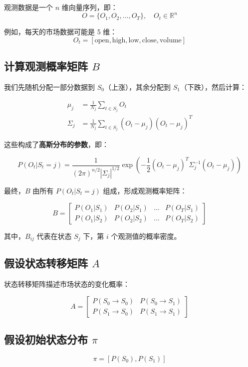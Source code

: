 \documentclass{article}
\begin{document}
观测数据是一个 $n$ 维向量序列，即：
\[
O = \{ O_1, O_2, ..., O_T \}, \quad O_t \in \mathbb{R}^n
\]

例如，每天的市场数据可能是 5 维：
\[
O_t = [\text{open}, \text{high}, \text{low}, \text{close}, \text{volume}]
\]

\subsection{计算观测概率矩阵 $B$}

我们先随机分配一部分数据到 $S_0$（上涨），其余分配到 $S_1$（下跌），然后计算：

\begin{align}
    \mu_j &= \frac{1}{N_j} \sum_{t \in S_j} O_t \\
    \Sigma_j &= \frac{1}{N_j} \sum_{t \in S_j} (O_t - \mu_j)(O_t - \mu_j)^T
\end{align}

这些构成了\textbf{高斯分布的参数}，即：

\[
P(O_t | S_t = j) = \frac{1}{(2\pi)^{n/2} |\Sigma_j|^{1/2}} \exp \left( -\frac{1}{2} (O_t - \mu_j)^T \Sigma_j^{-1} (O_t - \mu_j) \right)
\]

最终，$B$ 由所有 $P(O_t | S_t = j)$ 组成，形成观测概率矩阵：

\[
B =
\begin{bmatrix}
P(O_1 | S_1) & P(O_2 | S_1) & \dots & P(O_T | S_1) \\
P(O_1 | S_2) & P(O_2 | S_2) & \dots & P(O_T | S_2)
\end{bmatrix}
\]

其中，$B_{ij}$ 代表在状态 $S_j$ 下，第 $i$ 个观测值的概率密度。

\subsection{假设状态转移矩阵 $A$}

状态转移矩阵描述市场状态的变化概率：

\[
A =
\begin{bmatrix}
P(S_0 \to S_0) & P(S_0 \to S_1) \\
P(S_1 \to S_0) & P(S_1 \to S_1)
\end{bmatrix}
\]

\subsection{假设初始状态分布 $\pi$}

\[
\pi = [P(S_0), P(S_1)]
\]
\end{document}
